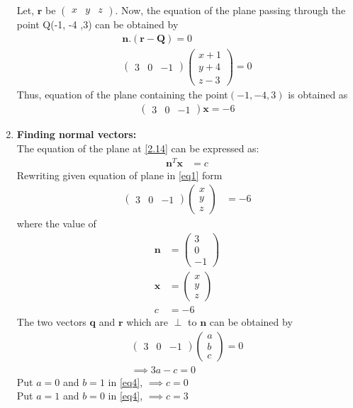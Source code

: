 \documentclass[journal,12pt,twocolumn]{IEEEtran}
\let\vec\mathbf
\numberwithin{equation}{subsection}
\newcommand{\myvec}[1]{\ensuremath{\begin{pmatrix}#1\end{pmatrix}}}
\begin{document}
\begin{enumerate}
Let, $\vec{r}$ be \myvec{x& y& z}. Now, the equation of the plane passing through the point Q(-1, -4 ,3) can be obtained by
\begin{align}
    \vec{n} . ( \vec{r} - \vec{Q}) = 0  \label{2.12}\\
    \myvec{3 & 0 & -1} \myvec{x+1 \\ y+4 \\ z-3} = 0
\end{align}
Thus, equation of the plane containing the point$(-1, -4 , 3)$ is obtained as
\begin{align}
    \myvec{3 & 0 & -1} \vec{x} = -6 \label{2.14}
\end{align}
\item \textbf{Finding normal vectors:}\\
The equation of the plane at \eqref{2.14} can be expressed as:
\begin{align}\label{eq1}
	\vec{n}^T\vec{x} &= c
\end{align}
Rewriting given equation of plane in \eqref{eq1} form
\begin{align}\label{eq2}
	\myvec{3 & 0 & -1}\myvec{x\\y\\z} &= -6
\end{align}
where the value of 
\begin{align}
    \vec{n} &= \myvec{3\\0\\-1} \\
    \vec{x} &= \myvec{x\\y\\z} \\
    c &= -6
\end{align}
The two vectors $\vec{q}$ and $\vec{r}$ which are $\perp$ to $\vec{n}$ can be obtained by 
\begin{align}
	\myvec{3 & 0 & -1}\myvec{a\\b\\c} = 0\\
	\implies 3a - c = 0 \label{eq4}
\end{align}
Put $a=0$ and $b=1$ in \eqref{eq4}, $\implies c=0$\\
Put $a=1$ and $b=0$ in \eqref{eq4}, $\implies c=3$\\


\end{enumerate}
\end{document}
